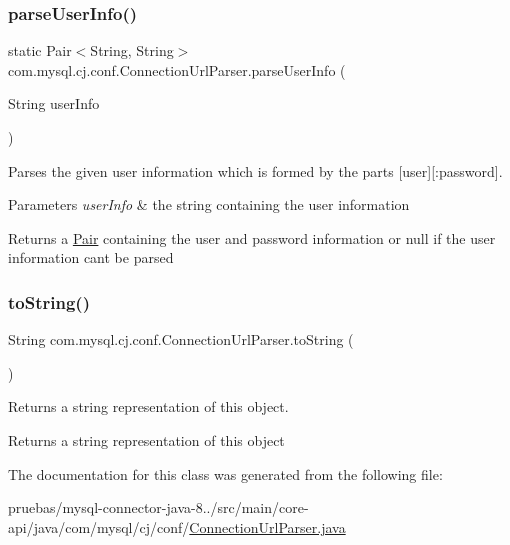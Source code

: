 \subsubsection{\texorpdfstring{parse\+User\+Info()}{parseUserInfo()}}
{\footnotesize\ttfamily static Pair$<$String, String$>$ com.\+mysql.\+cj.\+conf.\+Connection\+Url\+Parser.\+parse\+User\+Info (\begin{DoxyParamCaption}\item[{String}]{user\+Info }\end{DoxyParamCaption})\hspace{0.3cm}{\ttfamily [static]}}

Parses the given user information which is formed by the parts \mbox{[}user\mbox{]}\mbox{[}\+:password\mbox{]}.


\begin{DoxyParams}{Parameters}
{\em user\+Info} & the string containing the user information \\
\hline
\end{DoxyParams}
\begin{DoxyReturn}{Returns}
a \mbox{\hyperlink{}{Pair}} containing the user and password information or null if the user information can\textquotesingle{}t be parsed 
\end{DoxyReturn}
\mbox{\label{classcom_1_1mysql_1_1cj_1_1conf_1_1_connection_url_parser_add731ba88032454b1c17aaca658cd75e}} 
\subsubsection{\texorpdfstring{to\+String()}{toString()}}
{\footnotesize\ttfamily String com.\+mysql.\+cj.\+conf.\+Connection\+Url\+Parser.\+to\+String (\begin{DoxyParamCaption}{ }\end{DoxyParamCaption})}

Returns a string representation of this object.

\begin{DoxyReturn}{Returns}
a string representation of this object 
\end{DoxyReturn}


The documentation for this class was generated from the following file\+:\begin{DoxyCompactItemize}
\item 
pruebas/mysql-\/connector-\/java-\/8../src/main/core-\/api/java/com/mysql/cj/conf/\mbox{\hyperlink{_connection_url_parser_8java}{Connection\+Url\+Parser.\+java}}\end{DoxyCompactItemize}
